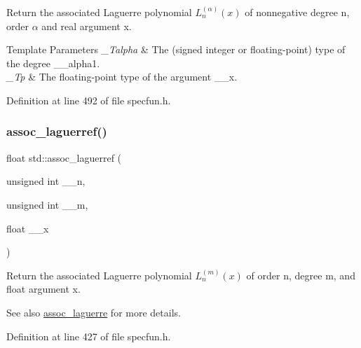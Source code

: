 Return the associated Laguerre polynomial $ L_n^{(\alpha)}(x) $ of nonnegative degree {\ttfamily n}, order $ \alpha $ and real argument {\ttfamily x}.


\begin{DoxyTemplParams}{Template Parameters}
{\em \+\_\+\+Talpha} & The (signed integer or floating-\/point) type of the degree {\ttfamily \+\_\+\+\_\+alpha1}. \\
\hline
{\em \+\_\+\+Tp} & The floating-\/point type of the argument {\ttfamily \+\_\+\+\_\+x}. \\
\hline
\end{DoxyTemplParams}


Definition at line 492 of file specfun.\+h.

\mbox{\label{group__mathsf__std_gaf83d98f350a1cfcebee6a1f723cf90d2}} 
\subsubsection{\texorpdfstring{assoc\+\_\+laguerref()}{assoc\_laguerref()}}
{\footnotesize\ttfamily float std\+::assoc\+\_\+laguerref (\begin{DoxyParamCaption}\item[{unsigned int}]{\+\_\+\+\_\+n,  }\item[{unsigned int}]{\+\_\+\+\_\+m,  }\item[{float}]{\+\_\+\+\_\+x }\end{DoxyParamCaption})\hspace{0.3cm}{\ttfamily [inline]}}

Return the associated Laguerre polynomial $ L_n^{(m)}(x) $ of order {\ttfamily n}, degree {\ttfamily m}, and {\ttfamily float} argument {\ttfamily x}.

\begin{DoxySeeAlso}{See also}
\hyperlink{group__mathsf__std_ga0b33e0ac3066f2353861ce2f34b43f57}{assoc\+\_\+laguerre} for more details. 
\end{DoxySeeAlso}


Definition at line 427 of file specfun.\+h.

\mbox{\label{group__mathsf__std_gac8e245671fb2df5de5fd978d03081f6c}} 
